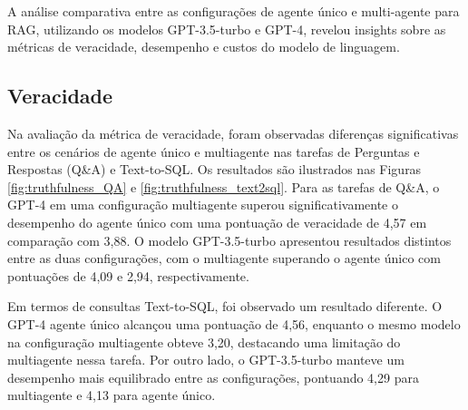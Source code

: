         
        A análise comparativa entre as configurações de agente único e multi-agente para RAG, utilizando os modelos GPT-3.5-turbo e GPT-4, revelou insights sobre as métricas de veracidade, desempenho e custos do modelo de linguagem.
    
    
        
        \subsection{Veracidade} 
        
            Na avaliação da métrica de veracidade, foram observadas diferenças significativas entre os cenários de agente único e multiagente nas tarefas de Perguntas e Respostas (Q\&A) e Text-to-SQL. Os resultados são ilustrados nas Figuras \ref{fig:truthfulness_QA} e \ref{fig:truthfulness_text2sql}. Para as tarefas de Q\&A, o GPT-4 em uma configuração multiagente superou significativamente o desempenho do agente único com uma pontuação de veracidade de 4,57 em comparação com 3,88. O modelo GPT-3.5-turbo apresentou resultados distintos entre as duas configurações, com o multiagente superando o agente único com pontuações de 4,09 e 2,94, respectivamente. 
            
            Em termos de consultas Text-to-SQL, foi observado um resultado diferente. O GPT-4 agente único alcançou uma pontuação de 4,56, enquanto o mesmo modelo na configuração multiagente obteve 3,20, destacando uma limitação do multiagente nessa tarefa. Por outro lado, o GPT-3.5-turbo manteve um desempenho mais equilibrado entre as configurações, pontuando 4,29 para multiagente e 4,13 para agente único.
            

